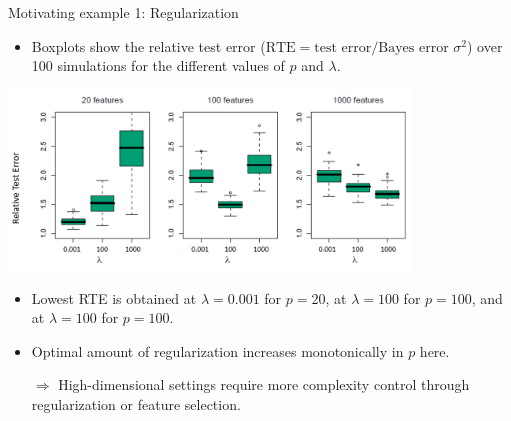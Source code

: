 \documentclass[11pt,compress,t,notes=noshow, xcolor=table]{beamer}
\begin{document}
\begin{vbframe}{Motivating example 1: Regularization}
  \begin{itemize}
  \small
    \item Boxplots show the relative test error ($\text{RTE} = \text{test error} / \text{Bayes error }\sigma^2$) over 100 simulations for the different values of $p$ and $\lambda$.
  \normalsize
  \end{itemize}
  \begin{center}
  \includegraphics[width = 0.8\textwidth]{figure_man/tibshirani_fig_18_1_mod.png}
  \end{center}
  \vspace{-0.3cm}
  \begin{itemize}\small
  \item Lowest RTE is obtained at $\lambda = 0.001$  for $p=20$, %
  at $\lambda = 100$ for $p=100$,%
  and at $\lambda = 100$ for $p=100$.%
 \item Optimal amount of regularization increases monotonically in $p$ here.
  \item[$\Rightarrow$] High-dimensional settings require more complexity control through regularization or feature selection.
  \end{itemize}
  \end{vbframe}
\end{document}
